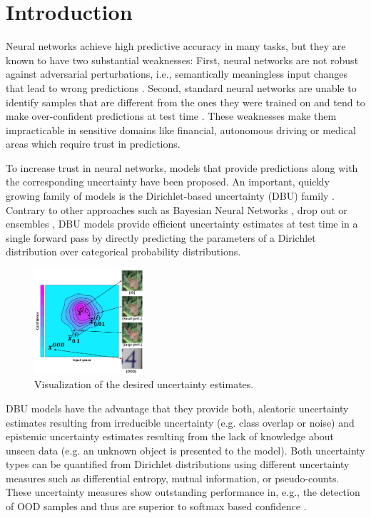 \section{Introduction}
\label{sec:introduction_008}

Neural networks achieve high predictive accuracy in many tasks, but they are known to have two substantial weaknesses: First, neural networks are not robust against adversarial perturbations, i.e., semantically meaningless input changes that lead to wrong predictions \citep{szegedy2014, goodfellow2014}. 
Second, standard neural networks are unable to identify samples that are different from the ones they were trained on and tend to make over-confident predictions at test time \citep{ensembles}. These weaknesses make them impracticable in sensitive domains like financial, autonomous driving or medical areas which require trust in predictions.



To increase trust in neural networks, models that provide predictions along with the corresponding uncertainty have been proposed. 
An important, quickly growing family of models is the Dirichlet-based uncertainty (DBU) family \citep{malini2018, distribution-distillation, sensoy2018, reverse-kl, charpentier2020, graph_uncertainty, max_gap_id_ood, multifaceted_uncertainty, uncertainty-generative-classifier}. 
Contrary to other approaches such as Bayesian Neural Networks \citep{bayesian-networks, osawa2019, simple-baseline-uncertainty}, drop out \citep{dropout} or ensembles \citep{ensembles}, DBU models provide efficient uncertainty estimates at test time in a single forward pass by directly predicting the parameters of a Dirichlet distribution over categorical probability distributions.
%
\begin{figure}[t]
\centering
\includegraphics[width=0.36\textwidth]{sections/008_icml2021/eval/uncertainty_diagram.png}
\caption{Visualization of the desired uncertainty estimates. 
}
\label{fig:uncertainty_attack_diagram}
\end{figure}
%
DBU models have the advantage that they provide both, aleatoric uncertainty estimates resulting from irreducible uncertainty (e.g. class overlap or noise) and epistemic uncertainty estimates resulting from the lack of knowledge about unseen data (e.g. an unknown object is presented to the model). Both uncertainty types can be quantified from Dirichlet distributions using different uncertainty measures such as differential entropy, mutual information, or pseudo-counts. These uncertainty measures show outstanding performance in, e.g., the detection of OOD samples and thus are superior to softmax based confidence \citep{malini2018, reverse-kl, charpentier2020}.

